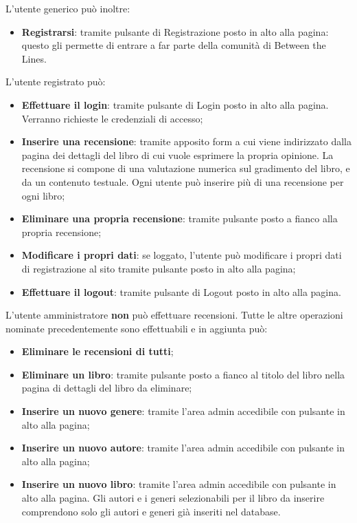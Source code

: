 \documentclass[12pt,a4paper,headings=optiontohead]{article}
\begin{document}
	L'utente generico può inoltre:
	\begin{itemize}
		\item \textbf{Registrarsi}: tramite pulsante di Registrazione posto in alto alla pagina: questo gli permette di entrare a far parte della comunità di Between the Lines.
	\end{itemize}
	
	L'utente registrato può:
	\begin{itemize}
		\item \textbf{Effettuare il login}: tramite pulsante di Login posto in alto alla pagina. Verranno richieste le credenziali di accesso;
		\item \textbf{Inserire una recensione}: tramite apposito form a cui viene indirizzato dalla pagina dei dettagli del libro di cui vuole esprimere la propria opinione. La recensione si compone di una valutazione numerica sul gradimento del libro, e da un contenuto testuale. Ogni utente può inserire più di una recensione per ogni libro;
		\item \textbf{Eliminare una propria recensione}: tramite pulsante posto a fianco alla propria recensione;
		\item \textbf{Modificare i propri dati}: se loggato, l'utente può modificare i propri dati di registrazione al sito tramite pulsante posto in alto alla pagina;
		\item \textbf{Effettuare il logout}: tramite pulsante di Logout posto in alto alla pagina.
	\end{itemize}

	L'utente amministratore \textbf{non} può effettuare recensioni. Tutte le altre operazioni nominate precedentemente sono effettuabili e in aggiunta può:
	\begin{itemize}
		\item \textbf{Eliminare le recensioni di tutti};
		\item \textbf{Eliminare un libro}: tramite pulsante posto a fianco al titolo del libro nella pagina di dettagli del libro da eliminare;
		\item \textbf{Inserire un nuovo genere}: tramite l'area admin accedibile con pulsante in alto alla pagina;
		\item \textbf{Inserire un nuovo autore}: tramite l'area admin accedibile con pulsante in alto alla pagina;
		\item \textbf{Inserire un nuovo libro}: tramite l'area admin accedibile con pulsante in alto alla pagina. Gli autori e i generi selezionabili per il libro da inserire comprendono solo gli autori e generi già inseriti nel database.
	\end{itemize}
	
\end{document}
